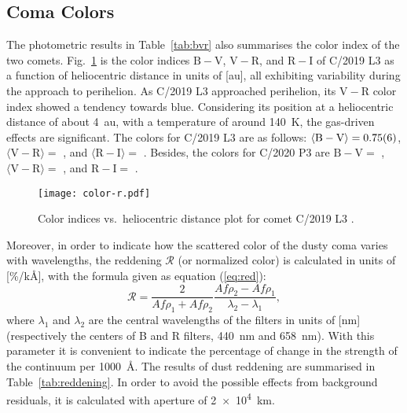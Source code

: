 \subsection{Coma Colors}

The photometric results in Table~\ref{tab:bvr} also summarises the color index of the two comets. 
Fig.~\ref{fig:color-r} is the color indices $\mathrm{B-V}$, $\mathrm{V-R}$, and $\mathrm{R-I}$ of C/2019 L3 as a function of heliocentric distance in units of [\unit{\astronomicalunit}], all exhibiting variability during the approach to perihelion. 
As C/2019 L3 approached perihelion, its $\mathrm{V-R}$ color index showed a tendency towards blue. 
Considering its position at a heliocentric distance of about {\qty{4}{\astronomicalunit}}, with a temperature of around {\qty{140}{\K}}, the gas-driven effects are significant. 
The colors for C/2019 L3 are as follows: 
$\langle \mathrm{B-V} \rangle = \num{0.75 +- 0.06}$, 
$\langle \mathrm{V-R} \rangle = $ , and 
$\langle \mathrm{R-I} \rangle = $ . 
Besides, the colors for C/2020 P3 are 
$\mathrm{B-V} = $ , 
$\langle \mathrm{V-R} \rangle = $ , and 
$\mathrm{R-I} = $ .

\begin{figure}
    \centering
    \texttt{[image: color-r.pdf]} 
    \caption{Color indices vs.\ heliocentric distance plot for comet C/2019 L3 .}\label{fig:color-r}
\end{figure}

Moreover, in order to indicate how the scattered color of the dusty coma varies with wavelengths, the reddening $\mathcal{R}$ (or normalized color) \citep{jewitt_cometary_1986, lara_behaviour_2003, mazzotta_epifani_dust_2011, shi_ccd_2015} is calculated in units of [\unit{\percent/\kilo\angstrom}], with the formula given as equation (\ref{eq:red}): 
\begin{equation}
\mathcal{R} = \frac{2}{Af\rho_1 + Af\rho_2} \frac{Af\rho_2 - Af\rho_1}{\lambda_2 - \lambda_1}, 
\label{eq:red}
\end{equation}
where $\lambda_1$ and $\lambda_2$ are the central wavelengths of the filters in units of [\unit{\nm}] (respectively the centers of B and R filters, {\qty{440}{\nm}} and {\qty{658}{\nm}}). With this parameter it is convenient to indicate the percentage of change in the strength of the continuum per {\qty{1000}{\angstrom}}. The results of dust reddening are summarised in Table~\ref{tab:reddening}. In order to avoid the possible effects from background residuals, it is calculated with aperture of {\qty{2e4}{\km}}. 


